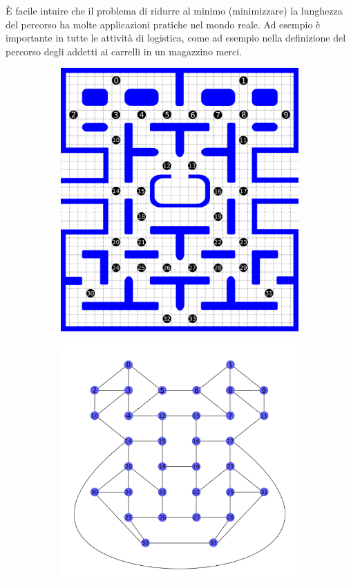 \documentclass[8pt]{book}
\begin{document}
È facile intuire che il problema di ridurre al minimo (minimizzare) la lunghezza del percorso ha molte applicazioni pratiche nel mondo reale. Ad esempio è importante in tutte le attività di logistica, come ad esempio nella definizione del percorso degli addetti ai carrelli in un magazzino merci.

\begin{figure}
  \centering
  \begin{subfigure}[b]{0.49\textwidth}
    \includegraphics[width=\textwidth]{img/vertici.png}
    \label{lab}
   \end{subfigure}
  \begin{subfigure}[b]{0.49\textwidth}
    \includegraphics[width=\textwidth]{img/grafoNumeri.png}

\end{subfigure}
\end{figure}
\end{document}
